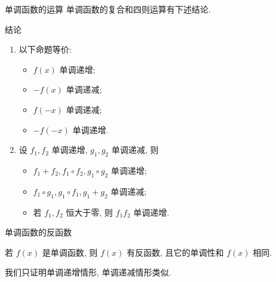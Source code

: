 \begin{frame}{单调函数的运算\noexer}
	\onslide<+->
	单调函数的复合和四则运算有下述结论.
	\onslide<+->
	\begin{block}{结论}
		\begin{enumerate}
			\item 以下命题等价:
				\begin{itemize}
					\item $f(x)$ 单调递增;
					\item $-f(x)$ 单调递减;
					\item $f(-x)$ 单调递减;
					\item $-f(-x)$ 单调递增.
				\end{itemize}
			\item 设 $f_1,f_2$ 单调递增, $g_1,g_2$ 单调递减, 则
				\begin{itemize}
					\item $f_1+f_2, f_1\circ f_2, g_1\circ g_2$ 单调递增;
					\item $f_1\circ g_1, g_1\circ f_1, g_1+g_2$ 单调递减;
					\item 若 $f_1,f_2$ 恒大于零, 则 $f_1f_2$ 单调递增.
				\end{itemize}
		\end{enumerate}
	\end{block}
\end{frame}


\begin{frame}{单调函数的反函数}
	\onslide<+->
	\begin{theorem}
		若 $f(x)$ 是单调函数, 则 $f(x)$ 有反函数, 且它的单调性和 $f(x)$ 相同.
	\end{theorem}
	\onslide<+->
	\begin{proof*}
		我们只证明单调递增情形, 单调递减情形类似.


	\end{proof*}
\end{frame}



